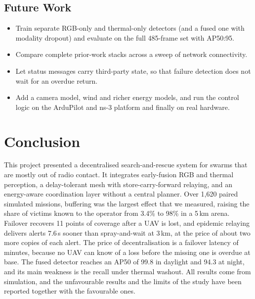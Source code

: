 \documentclass[10pt,letterpaper]{article}
\begin{document}
\subsection{Future Work}
\begin{itemize}
\item Train separate RGB-only and thermal-only detectors (and a fused one with modality dropout) and evaluate on the full 485-frame set with AP50:95.
\item Compare complete prior-work stacks across a sweep of network connectivity.
\item Let status messages carry third-party state, so that failure detection does not wait for an overdue return.
\item Add a camera model, wind and richer energy models, and run the control logic on the ArduPilot and ns-3 platform and finally on real hardware.
\end{itemize}

\section{Conclusion}\label{sec:concl}
This project presented a decentralised search-and-rescue system for swarms that are mostly out of radio contact. It integrates early-fusion RGB and thermal perception, a delay-tolerant mesh with store-carry-forward relaying, and an energy-aware coordination layer without a central planner. Over 1,620 paired simulated missions, buffering was the largest effect that we measured, raising the share of victims known to the operator from 3.4\% to 98\% in a 5\,km arena. Failover recovers 11 points of coverage after a UAV is lost, and epidemic relaying delivers alerts 7.6\,s sooner than spray-and-wait at 3\,km, at the price of about two more copies of each alert. The price of decentralisation is a failover latency of minutes, because no UAV can know of a loss before the missing one is overdue at base. The fused detector reaches an AP50 of 99.8 in daylight and 94.3 at night, and its main weakness is the recall under thermal washout. All results come from simulation, and the unfavourable results and the limits of the study have been reported together with the favourable ones.

\clearpage
{}
\renewcommand{\refname}{References}

\end{document}

